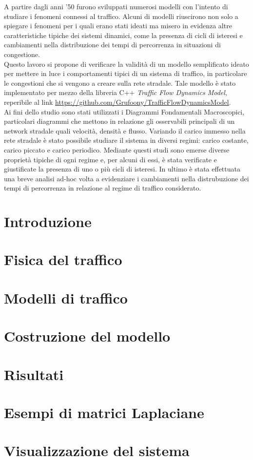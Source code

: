 \documentclass[12pt,a4paper]{report}
\begin{document}
A partire dagli anni '50 furono sviluppati numerosi modelli con l'intento di studiare i fenomeni connessi al traffico.
Alcuni di modelli riuscirono non solo a spiegare i fenomeni per i quali erano stati ideati ma misero in evidenza altre caratteristiche tipiche dei sistemi dinamici, come la presenza di cicli di isteresi e cambiamenti nella distribuzione dei tempi di percorrenza in situazioni di congestione.\\
Questo lavoro si propone di verificare la validit\`a di un modello semplificato ideato per mettere in luce i comportamenti tipici di un sistema di traffico, in particolare le congestioni che si vengono a creare sulla rete stradale.
Tale modello \`e stato implementato per mezzo della libreria C++ \emph{Traffic Flow Dynamics Model}, reperibile al link \url{https://github.com/Grufoony/TrafficFlowDynamicsModel}.\\
Ai fini dello studio sono stati utilizzati i Diagrammi Fondamentali Macroscopici, particolari diagrammi che mettono in relazione gli osservabili principali di un network stradale quali velocit\`a, densit\`a e flusso.
Variando il carico immesso nella rete stradale \`e stato possibile studiare il sistema in diversi regimi: carico costante, carico piccato e carico periodico.
Mediante questi studi sono emerse diverse propriet\`a tipiche di ogni regime e, per alcuni di essi, \`e stata verificate e giustificate la presenza di uno o pi\`u cicli di isteresi.
In ultimo \`e stata effettuata una breve analisi ad-hoc volta a evidenziare i cambiamenti nella distrubuzione dei tempi di percorrenza in relazione al regime di traffico considerato.

\tableofcontents
\listoffigures

\chapter*{Introduzione}


\chapter{Fisica del traffico}


\chapter{Modelli di traffico}


\chapter{Costruzione del modello}


\chapter{Risultati}


\appendix

\chapter{Esempi di matrici Laplaciane}
\label{appendix:laplacian}

\chapter{Visualizzazione del sistema}
\label{appendix:visual}


\printbibliography
\end{document}
